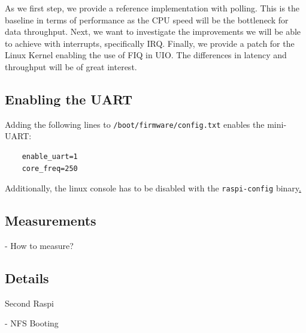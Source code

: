 \documentclass[../main.tex]{subfiles}
\begin{document}
    \clearpage




    \clearpage

    As we first step, we provide a reference implementation with polling. This is the baseline in terms of performance as the CPU speed will be the bottleneck for data throughput. Next, we want to investigate the improvements we will be able to achieve with interrupts, specifically IRQ. Finally, we provide a patch for the Linux Kernel enabling the use of FIQ in UIO. The differences in latency and throughput will be of great interest.

    \subsection{Enabling the UART}

    Adding the following lines to \texttt{/boot/firmware/config.txt} enables the mini-UART:
    \begin{verbatim}
    enable_uart=1
    core_freq=250
    \end{verbatim}

    Additionally, the linux console has to be disabled with the \texttt{raspi-config} binary\href{https://www.raspberrypi.com/documentation/computers/configuration.html\#disabling-the-linux-serial-console}. 

    \subsection{Measurements}
    - How to measure?

    \subsection{Details}
    Second Raspi

    - NFS Booting
\end{document}
